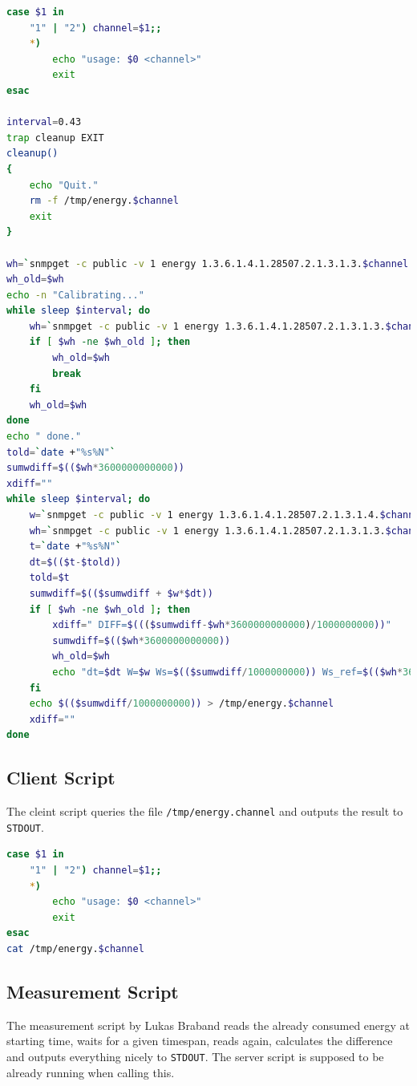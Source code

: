 \documentclass[]{report}
\begin{document}
\begin{lstlisting}[language=bash, style=code, caption=energie-mess-server.sh]
case $1 in
    "1" | "2") channel=$1;;
    *)
        echo "usage: $0 <channel>"  
        exit
esac

interval=0.43
trap cleanup EXIT
cleanup()
{
    echo "Quit."
    rm -f /tmp/energy.$channel
    exit
}

wh=`snmpget -c public -v 1 energy 1.3.6.1.4.1.28507.2.1.3.1.3.$channel | awk '{ print $4 }'`
wh_old=$wh
echo -n "Calibrating..."
while sleep $interval; do
    wh=`snmpget -c public -v 1 energy 1.3.6.1.4.1.28507.2.1.3.1.3.$channel | awk '{ print $4 }'`
    if [ $wh -ne $wh_old ]; then
        wh_old=$wh
        break
    fi
    wh_old=$wh
done
echo " done."
told=`date +"%s%N"`
sumwdiff=$(($wh*3600000000000))
xdiff=""
while sleep $interval; do
    w=`snmpget -c public -v 1 energy 1.3.6.1.4.1.28507.2.1.3.1.4.$channel | awk '{ print $4 }'`
    wh=`snmpget -c public -v 1 energy 1.3.6.1.4.1.28507.2.1.3.1.3.$channel | awk '{ print $4 }'`
    t=`date +"%s%N"`
    dt=$(($t-$told))
    told=$t
    sumwdiff=$(($sumwdiff + $w*$dt))
    if [ $wh -ne $wh_old ]; then
        xdiff=" DIFF=$((($sumwdiff-$wh*3600000000000)/1000000000))"
        sumwdiff=$(($wh*3600000000000))
        wh_old=$wh
        echo "dt=$dt W=$w Ws=$(($sumwdiff/1000000000)) Ws_ref=$(($wh*3600))$xdiff"
    fi
    echo $(($sumwdiff/1000000000)) > /tmp/energy.$channel
    xdiff=""
done
\end{lstlisting}

\subsection{Client Script}\label{client-script}

The cleint script queries the file \lstinline!/tmp/energy.channel! and
outputs the result to \lstinline!STDOUT!.

\begin{lstlisting}[language=bash, style=code, caption=energie-mess-client.sh]
case $1 in
    "1" | "2") channel=$1;;
    *)
        echo "usage: $0 <channel>"  
        exit
esac
cat /tmp/energy.$channel
\end{lstlisting}

\subsection{Measurement Script}\label{measurement-script}

The measurement script by Lukas Braband reads the already consumed
energy at starting time, waits for a given timespan, reads again,
calculates the difference and outputs everything nicely to
\lstinline!STDOUT!. The server script is supposed to be already running
when calling this.
\end{document}
